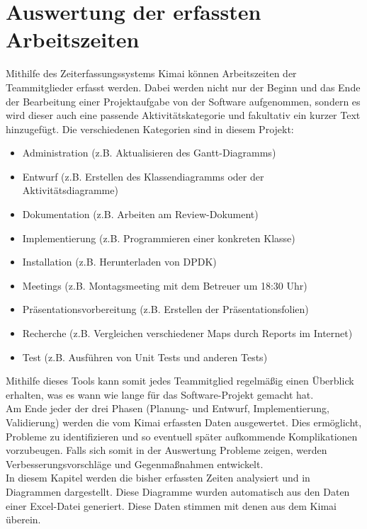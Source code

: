 \documentclass[../review_3.tex]{subfiles}
\begin{document}
\chapter{Auswertung der erfassten Arbeitszeiten}\thispagestyle{fancy}
Mithilfe des  Zeiterfassungssystems Kimai können Arbeitszeiten der Teammitglieder erfasst werden. Dabei werden nicht nur der Beginn und das Ende der Bearbeitung einer Projektaufgabe von der Software aufgenommen, sondern es wird dieser auch eine passende Aktivitätskategorie und fakultativ ein kurzer Text hinzugefügt. Die verschiedenen Kategorien sind in diesem Projekt:
\begin{itemize}
    \setlength{\parskip}{-0.2pt}
    \item Administration (z.B. Aktualisieren des Gantt-Diagramms)
    \item Entwurf (z.B. Erstellen des Klassendiagramms oder der Aktivitätsdiagramme)
    \item Dokumentation (z.B. Arbeiten am Review-Dokument)
    \item Implementierung (z.B. Programmieren einer konkreten Klasse)
    \item Installation (z.B. Herunterladen von DPDK)
    \item Meetings (z.B. Montagsmeeting mit dem Betreuer um 18:30 Uhr)
    \item Präsentationsvorbereitung (z.B. Erstellen der Präsentationsfolien)
    \item Recherche (z.B. Vergleichen verschiedener Maps durch Reports im Internet)
    \item Test (z.B. Ausführen von Unit Tests und anderen Tests)
\end{itemize}
Mithilfe dieses Tools kann somit jedes Teammitglied regelmäßig einen Überblick erhalten, was es wann wie lange für das Software-Projekt gemacht hat. \\
Am Ende jeder der drei Phasen (Planung- und Entwurf, Implementierung, Validierung) werden die vom Kimai erfassten Daten ausgewertet. Dies ermöglicht, Probleme zu identifizieren und so eventuell später aufkommende Komplikationen vorzubeugen. Falls sich somit in der Auswertung Probleme zeigen, werden Verbesserungsvorschläge und Gegenmaßnahmen entwickelt. \\
In diesem Kapitel werden die bisher erfassten Zeiten analysiert und in Diagrammen dargestellt. Diese Diagramme wurden automatisch aus den Daten einer Excel-Datei generiert. Diese Daten stimmen mit denen aus dem Kimai überein. %
\end{document}
